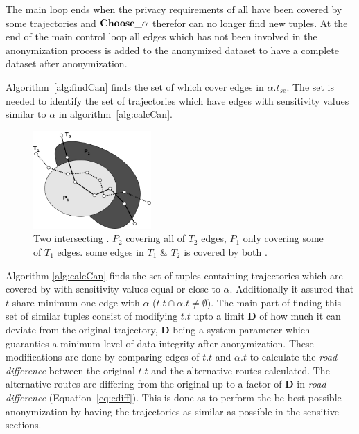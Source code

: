 The main loop ends when the privacy requirements of all \poi have been covered by some trajectories and ${\bf Choose\_\alpha}$ therefor can no longer find new tuples.
At the end of the main control loop all edges which has not been involved in the anonymization process is added to the anonymized dataset to have a complete dataset after anonymization.





Algorithm~\ref{alg:findCan} finds the set of \poi which cover edges in \(\alpha.t_{se}\). The \poi set is needed to identify the set of trajectories which have edges with sensitivity values similar to \(\alpha\) in algorithm~\ref{alg:calcCan}. 

\begin{figure}	
       \center
	\includegraphics[width=0.40\textwidth]{figures/poiIntersect.pdf} 
       \caption{Two intersecting \poisns. $P_2$ covering all of $T_2$ edges, $P_1$ only covering some of $T_1$ edges. some edges in $T_1$ \& $T_2$ is covered by both \poins.}
  \label{fig:poiOverlap}
\end{figure}





Algorithm \ref{alg:calcCan} finds the set of tuples containing trajectories which are covered by \poi with sensitivity values equal or close to $\alpha$. Additionally it assured that $t$ share minimum one edge with $\alpha$ ($t.t \cap \alpha.{t} \neq \emptyset$).
The main part of finding this set of similar tuples consist of modifying $t.t$ upto a limit $\mathbf{D}$ of how much it can deviate from the original trajectory, $\mathbf{D}$ being a system parameter which guaranties a minimum level of data integrity after anonymization. These modifications are done by comparing edges of $t.t$ and $\alpha.{t}$ to calculate the {\it road difference} between the original $t.t$ and the alternative routes calculated. The alternative routes are differing from the original up to a factor of $\mathbf{D}$ in {\it road difference} (Equation~\ref{eq:ediff}). This is done as to perform the be best possible anonymization by having the trajectories as similar as possible in the sensitive sections.

